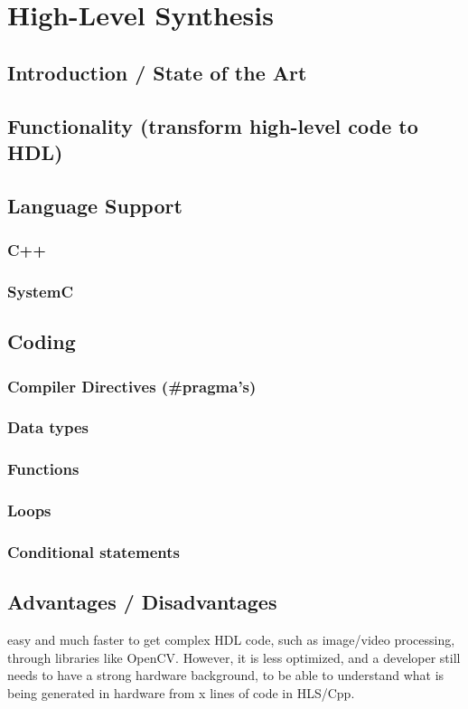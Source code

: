 \chapter[HLS]{High-Level Synthesis}
\label{cha:HLS}

\section{Introduction / State of the Art}

\section{Functionality (transform high-level code to HDL)}

\section{Language Support}

  \subsection{C++}

  \subsection{SystemC}

\section{Coding}

  \subsection{Compiler Directives (\#pragma's)}

  \subsection{Data types}

  \subsection{Functions}

  \subsection{Loops}

  \subsection{Conditional statements}

\section{Advantages / Disadvantages}
    easy and much faster to get complex HDL code, such as image/video processing, through libraries like OpenCV. However, it is less optimized, and a developer still needs to have a strong hardware background, to be able to understand what is being generated in hardware from x lines of code in HLS/Cpp.
